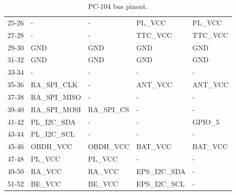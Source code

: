 \begin{table}[!h]
\begin{tabular}{cllll}
        25-26              & -                & -                & PL\_VCC         & PL\_VCC          \\
        27-28              & -                & -                & TTC\_VCC        & TTC\_VCC         \\
        29-30              & GND              & GND              & GND             & GND              \\
        31-32              & GND              & GND              & GND             & GND              \\
        33-34              & -                & -                & -               & -                \\
        35-36              & RA\_SPI\_CLK     & -                & ANT\_VCC        & ANT\_VCC         \\
        37-38              & RA\_SPI\_MISO    & -                & -               & -                \\
        39-40              & RA\_SPI\_MOSI    & RA\_SPI\_CS      & -               & -                \\
        41-42              & PL\_I2C\_SDA     & -                & -               & GPIO\_5          \\
        43-44              & PL\_I2C\_SCL     & -                & -               & -                \\
        45-46              & OBDH\_VCC        & OBDH\_VCC        & BAT\_VCC        & BAT\_VCC         \\
        47-48              & PL\_VCC          & PL\_VCC          & -               & -                \\
        49-50              & RA\_VCC          & RA\_VCC          & EPS\_I2C\_SDA   & -                \\
        51-52              & BE\_VCC          & BE\_VCC          & EPS\_I2C\_SCL   & -                \\
        \bottomrule[1.5pt]
    \end{tabular}
    \caption{PC-104 bus pinout.}
    \label{tab:pc104-pinout}
\end{table}

